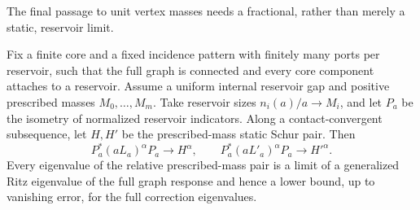 The final passage to unit vertex masses needs a fractional, rather
than merely a static, reservoir limit.
\begin{lemma}\label{sharp:lem:reservoir}
Fix a finite core and a fixed incidence pattern with finitely many
ports per reservoir, such that the full graph is connected and every
core component attaches to a reservoir. Assume a uniform internal
reservoir gap and positive prescribed masses $M_0,\ldots,M_m$.
Take reservoir sizes $n_i(a)/a\to M_i$, and let $P_a$ be the isometry
of normalized reservoir indicators. Along a contact-convergent
subsequence, let $H,H'$ be the prescribed-mass static Schur pair. Then
\[
 P_a^*(aL_a)^\alpha P_a\longrightarrow H^\alpha,\qquad
 P_a^*(aL'_a)^\alpha P_a\longrightarrow {H'}^\alpha.
\]
Every eigenvalue of the relative prescribed-mass pair is a limit of a
generalized Ritz eigenvalue of the full graph response and hence a
lower bound, up to vanishing error, for the full correction eigenvalues.
\end{lemma}
